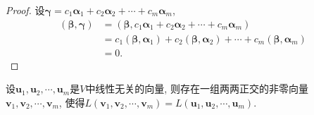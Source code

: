 \begin{proof}
  设$\bm{\gamma} = c_1\bm{\alpha}_1+c_2\bm{\alpha}_2+\cdots+c_m\bm{\alpha}_m$,
  \begin{align*}
    (\bm{\beta},\bm{\gamma}) & = (\bm{\beta},c_1\bm{\alpha}_1+c_2\bm{\alpha}_2+\cdots+c_m\bm{\alpha}_m)\\
    & = c_1(\bm{\beta},\bm{\alpha}_1)+c_2(\bm{\beta},\bm{\alpha}_2)+\cdots+c_m(\bm{\beta},\bm{\alpha}_m)\\
    & = 0.
  \end{align*}
\end{proof}

\begin{theorem}
  设$\bm{u}_1,\bm{u}_2,\cdots,\bm{u}_m$是$V$中线性无关的向量,
  则存在一组两两正交的非零向量$\bm{v}_1,\bm{v}_2,\cdots,\bm{v}_m$,
  使得$L(\bm{v}_1,\bm{v}_2,\cdots,\bm{v}_m)=L(\bm{u}_1,\bm{u}_2,\cdots,\bm{u}_m)$.
\end{theorem}

